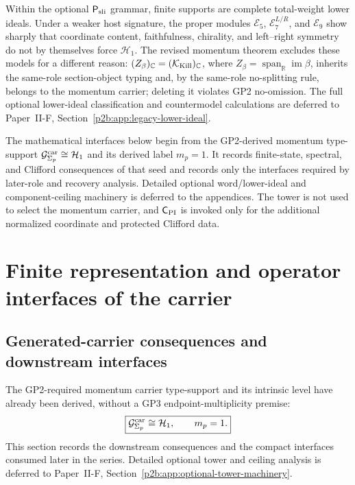\documentclass[12pt,a4paper]{article}
\begin{document}
\begin{remark}
\label{p2:rem:legacy-lower-ideal-pointer}
Within the optional \(\mathsf P_{\rm sli}\) grammar, finite supports are
complete total-weight lower ideals.  Under a weaker host signature,
the proper modules \(\mathcal E_5\), \(\mathcal E_7^{L/R}\), and
\(\mathcal E_9\) show sharply that coordinate content, faithfulness, chirality,
and left--right symmetry do not by themselves force \(\mathcal H_1\).  The
revised momentum theorem excludes these models for a different reason:
\((Z_\beta)_{\mathbb C}=(\mathcal K_{\rm Kill})_{\mathbb C}\), where
\(Z_\beta=\operatorname{span}_{\mathbb R}\operatorname{im}\beta\), inherits
the same-role section-object typing and, by the same-role no-splitting rule,
belongs to the momentum carrier; deleting it violates GP2 no-omission.  The full optional
lower-ideal classification and countermodel calculations are deferred to
Paper~II-F, Section~\ref{p2b:app:legacy-lower-ideal}.
\end{remark}

\label{p2:part:minimal-bookkeeping}

The mathematical interfaces below begin from the GP2-derived momentum type-support
\(\mathcal G^{\rm car}_{\Sigma_p}\cong\mathcal H_1\) and its
derived label \(m_p=1\).  It records
finite-state, spectral, and Clifford consequences of that seed and records
only the interfaces required by later-role and recovery analysis.  Detailed
optional word/lower-ideal and component-ceiling machinery is deferred to the
appendices.  The tower is not used to select the momentum carrier, and
\(\mathsf C_{\rm PI}\) is invoked only for the additional normalized
coordinate and protected Clifford data.

\section{Finite representation and operator interfaces of the carrier}
\label{paper2b:sec:organized-carrier}

\subsection{Generated-carrier consequences and downstream interfaces}
\label{p2:sec:uniqueness-m1}

The GP2-required momentum carrier type-support and its intrinsic level have
already been derived, without a GP3 endpoint-multiplicity premise:
\[
 \boxed{\mathcal G^{\rm car}_{\Sigma_p}\cong\mathcal H_1,\qquad m_p=1.}
\]
This section records the downstream consequences and the compact interfaces
consumed later in the series.  Detailed optional tower and ceiling analysis is
deferred to Paper~II-F, Section~\ref{p2b:app:optional-tower-machinery}.
\end{document}
